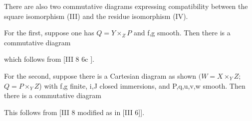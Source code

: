 \documentclass[12pt]{book}
\begin{document}
There are also two commutative diagrams expressing compatibility between the square isomorphism (III) and the residue isomorphism (IV).

For the first, suppose one has \(Q=Y \times_{Z} P\) and f,g smooth. Then there is a commutative diagram

\setcounter{page}{317}
which follows from [III 8 6c ].

For the second, suppose there is a Cartesian diagram as shown \((W=X \times_{Y} Z\); \(Q=P \times_{Y} Z\)) with f,g finite, i,J closed immersions, and P,q,u,v,w smooth. Then there is a commutative diagram

This follows from [III 8 modified as in [III 6]].
\end{document}
